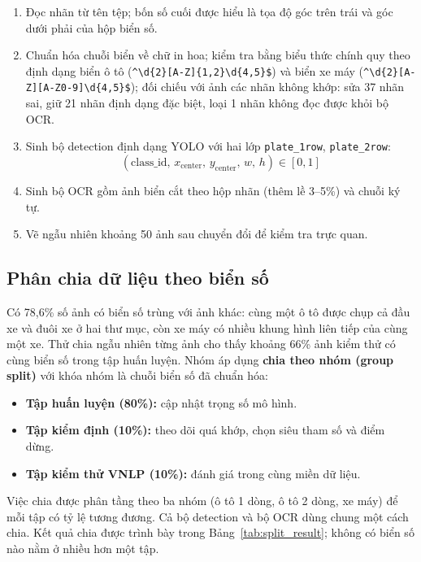 \begin{enumerate}
  \item Đọc nhãn từ tên tệp; bốn số cuối được hiểu là tọa độ góc trên trái và góc dưới phải của hộp biển số.
  \item Chuẩn hóa chuỗi biển về chữ in hoa; kiểm tra bằng biểu thức chính quy theo định dạng biển ô tô (\texttt{\textasciicircum\textbackslash d\{2\}[A-Z]\{1,2\}\textbackslash d\{4,5\}\$}) và biển xe máy (\texttt{\textasciicircum\textbackslash d\{2\}[A-Z][A-Z0-9]\textbackslash d\{4,5\}\$}); đối chiếu với ảnh các nhãn không khớp: sửa 37 nhãn sai, giữ 21 nhãn định dạng đặc biệt, loại 1 nhãn không đọc được khỏi bộ OCR.
  \item Sinh bộ detection định dạng YOLO với hai lớp \texttt{plate\_1row}, \texttt{plate\_2row}:
  \[
    (\text{class\_id},\, x_{\text{center}},\, y_{\text{center}},\, w,\, h) \in [0,1]
  \]
  \item Sinh bộ OCR gồm ảnh biển cắt theo hộp nhãn (thêm lề 3--5\%) và chuỗi ký tự.
  \item Vẽ ngẫu nhiên khoảng 50 ảnh sau chuyển đổi để kiểm tra trực quan.
\end{enumerate}

\subsection{Phân chia dữ liệu theo biển số}

Có 78,6\% số ảnh có biển số trùng với ảnh khác: cùng một ô tô được chụp cả đầu xe và đuôi xe ở hai thư mục, còn xe máy có nhiều khung hình liên tiếp của cùng một xe. Thử chia ngẫu nhiên từng ảnh cho thấy khoảng 66\% ảnh kiểm thử có cùng biển số trong tập huấn luyện. Nhóm áp dụng \textbf{chia theo nhóm (group split)} với khóa nhóm là chuỗi biển số đã chuẩn hóa:

\begin{itemize}
  \item \textbf{Tập huấn luyện (80\%):} cập nhật trọng số mô hình.
  \item \textbf{Tập kiểm định (10\%):} theo dõi quá khớp, chọn siêu tham số và điểm dừng.
  \item \textbf{Tập kiểm thử VNLP (10\%):} đánh giá trong cùng miền dữ liệu.
\end{itemize}

Việc chia được phân tầng theo ba nhóm (ô tô 1 dòng, ô tô 2 dòng, xe máy) để mỗi tập có tỷ lệ tương đương. Cả bộ detection và bộ OCR dùng chung một cách chia. Kết quả chia được trình bày trong Bảng~\ref{tab:split_result}; không có biển số nào nằm ở nhiều hơn một tập.

